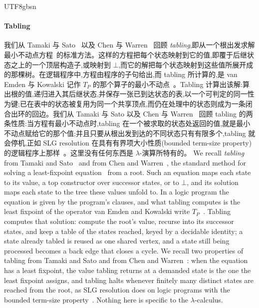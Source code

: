 \begin{CJK*}{UTF8}{gbsn}
  \paragraph{Tabling}
  \ifPaperChinese
  我们从 Tamaki 与 Sato~\cite{tamaki1986-tabled-resolution} 以及 Chen 与 Warren~\cite{chen1996-tabled-evaluation-delaying} 回顾 \emph{tabling},即从一个根出发求解最小不动点方程~\cite{vanemden1976-predicate-logic-semantics}的标准方法。这样的方程把每个状态映射到它的值,即覆于后继状态之上的一个顶层构造子,或映射到 $\bot$,而它的解把每个状态映射到这些值所展开成的那棵树。在逻辑程序中,方程由程序的子句给出,而 tabling 所计算的,是 van Emden 与 Kowalski 记作 $T_P$ 的那个算子的最小不动点~\cite{vanemden1976-predicate-logic-semantics}。Tabling 计算出该解:算出根的值,递归进入其后继状态,并保存一张已到达状态的表,以一个可判定的同一性为键;已在表中的状态被复用为同一个共享顶点,而仍在处理中的状态则成为一条闭合出环的回边。我们从 Tamaki 与 Sato 以及 Chen 与 Warren~\cite{tamaki1986-tabled-resolution, chen1996-tabled-evaluation-delaying} 回顾 tabling 的两条性质:当方程有最小不动点时,tabling 在一个被求取的状态处返回的值,就是最小不动点赋给它的那个值;并且只要从根出发到达的不同状态只有有限多个,tabling 就会停机,正如 SLG resolution 在具有有界项大小性质(bounded term-size property)的逻辑程序上那样~\cite{chen1996-tabled-evaluation-delaying}。这里没有任何东西是 $\lambda$-演算所特有的。
  \else
  We recall \emph{tabling} from Tamaki and Sato~\cite{tamaki1986-tabled-resolution} and from Chen and Warren~\cite{chen1996-tabled-evaluation-delaying}, the standard method for solving a least-fixpoint equation~\cite{vanemden1976-predicate-logic-semantics} from a root. Such an equation maps each state to its value, a top constructor over successor states, or to $\bot$, and its solution maps each state to the tree these values unfold to. In a logic program the equation is given by the program's clauses, and what tabling computes is the least fixpoint of the operator van Emden and Kowalski write $T_P$~\cite{vanemden1976-predicate-logic-semantics}. Tabling computes that solution: compute the root's value, recurse into its successor states, and keep a table of the states reached, keyed by a decidable identity; a state already tabled is reused as one shared vertex, and a state still being processed becomes a back edge that closes a cycle. We recall two properties of tabling from Tamaki and Sato and from Chen and Warren~\cite{tamaki1986-tabled-resolution, chen1996-tabled-evaluation-delaying}: when the equation has a least fixpoint, the value tabling returns at a demanded state is the one the least fixpoint assigns, and tabling halts whenever finitely many distinct states are reached from the root, as SLG resolution does on logic programs with the bounded term-size property~\cite{chen1996-tabled-evaluation-delaying}. Nothing here is specific to the $\lambda$-calculus.
  \fi


\end{CJK*}
